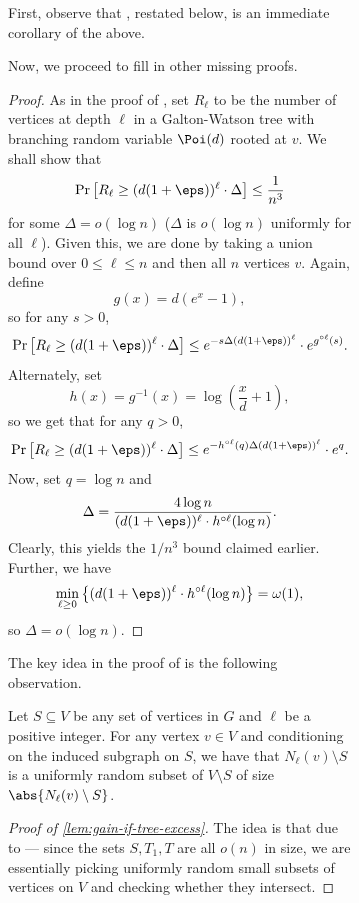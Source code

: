 \documentclass[11pt,letterpaper]{article}
\begin{document}
\begin{figure}
\begin{figure}
First, observe that , restated below, is an immediate corollary of the above.
\radiusbound*

Now, we proceed to fill in other missing proofs.
\logloglog*

\begin{proof}
    As in the proof of , set $R_\ell$ to be the number of vertices at depth $\ell$ in a Galton-Watson tree with branching random variable $\Poi(d)$ rooted at $v$. We shall show that
    \[ \Pr\left[ R_\ell \ge (d(1+\eps))^{\ell} \cdot \Delta \right] \le \frac{1}{n^3} \]
    for some $\Delta = o(\log n)$ ($\Delta$ is $o(\log n)$ uniformly for all $\ell$). Given this, we are done by taking a union bound over $0 \le \ell \le n$ and then all $n$ vertices $v$. Again, define
    \[ g(x) = d(e^x - 1), \]
    so for any $s > 0$,
    \[ \Pr \left[ R_\ell \ge (d(1+\eps))^{\ell} \cdot \Delta \right] \le e^{-s \Delta (d(1+\eps))^{\ell}} \cdot e^{g^{\circ \ell}(s)}. \]
    Alternately, set
    \[ h(x) = g^{-1}(x) = \log \left( \frac{x}{d} + 1 \right), \]
    so we get that for any $q > 0$,
    \[ \Pr \left[ R_\ell \ge (d(1+\eps))^{\ell} \cdot \Delta \right] \le e^{-h^{\circ \ell}(q) \Delta (d(1+\eps))^{\ell}} \cdot e^{q}. \]
    Now, set $q = \log n$ and
    \[ \Delta = \frac{4 \log n}{(d(1+\eps))^{\ell} \cdot h^{\circ \ell}(\log n)}. \]
    Clearly, this yields the $1/n^3$ bound claimed earlier. Further, we have
    \[ \min_{\ell \ge 0} \left\{(d(1+\eps))^{\ell} \cdot h^{\circ \ell}(\log n)\right\} = \omega(1), \]
    so $\Delta = o(\log n)$.
\end{proof}

The key idea in the proof of  is the following observation.

\begin{observation}
    \label{obs:uniformity-nbds}
    Let $S \subseteq V$ be any set of vertices in $G$ and $\ell$ be a positive integer. For any vertex $v \in V$ and conditioning on the induced subgraph on $S$, we have that $N_{\ell}(v) \setminus S$ is a uniformly random subset of $V \setminus S$ of size $\abs{N_{\ell}(v) \setminus S}$. 
\end{observation}

\lineedgesgain*

\begin{proof}[Proof of \cref{lem:gain-if-tree-excess}] 
    The idea is that due to  --- since the sets $S, T_1, T$ are all $o(n)$ in size, we are essentially picking uniformly random small subsets of vertices on $V$ and checking whether they intersect.


\end{proof}
\end{figure}
\end{figure}
\end{document}
